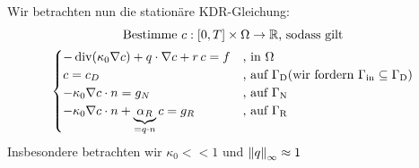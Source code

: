Wir betrachten nun die stationäre KDR-Gleichung:
\begin{gather*}
	\text{Bestimme } c:[0,T] \times \Omega \to \mathbb{R} \text{, sodass gilt}\\
	\begin{cases}
		- \operatorname{div}(\kappa_0 \nabla c) + q \cdot \nabla c + r \, c = f &\text{, in } \Omega\\
		c = c_D &\text{, auf } \Gamma_{\text{D}} (\text{wir fordern } \Gamma_{{\text{in}}} \subseteq \Gamma_{\text{D}})\\
		-\kappa_0 \nabla c \cdot n = g_N &\text{, auf } \Gamma_{\text{N}}\\
		-\kappa_0 \nabla c \cdot n  + \underbrace{\alpha_R}_{= q \cdot n} c = g_R &\text{, auf } \Gamma_{\text{R}}
	\end{cases}
\end{gather*}
Insbesondere betrachten wir $ \kappa_0 << 1 $ und $ \norm{q}_\infty \approx 1 $

